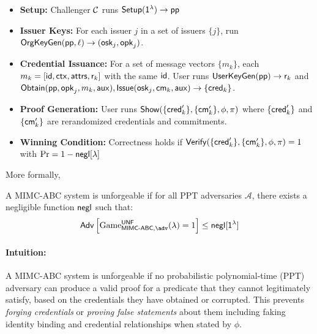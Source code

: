     \begin{itemize}
        \item \textbf{Setup:} Challenger $\mathcal{C}$ runs $\mathsf{Setup}(\mathsf{1^{\lambda}}) \to \mathsf{pp}$
        \item \textbf{Issuer Keys:} For each issuer $j$ in a set of issuers $\{j\}$, run $\mathsf{OrgKeyGen}(\mathsf{pp}, \ell) \to (\mathsf{osk}_j, \mathsf{opk}_j)$.
        \item \textbf{Credential Issuance: } For a set of message vectors $\{m_k\}$, each $m_k = [\mathsf{id}, \mathsf{ctx}, \mathsf{attrs}, \mathsf{r}_k]$ with the same $\mathsf{id}$. User runs $\mathsf{UserKeyGen}(\mathsf{pp}) \to \mathsf{r}_k$ and $\mathsf{Obtain}(\mathsf{pp}, \mathsf{opk}_j, m_k, \mathsf{aux}),\mathsf{Issue}(\mathsf{osk}_j, \mathsf{cm}_k, \mathsf{aux}) \to \{\mathsf{cred}_k\}$. 
        \item \textbf{Proof Generation:} User runs $\mathsf{Show}(\{\mathsf{cred}_k'\}, \{\mathsf{cm}_k'\}, \phi, \pi)$ where $\{\mathsf{cred}_k'\}$ and $\{\mathsf{cm}_k'\}$ are rerandomized credentials and commitments.
        \item \textbf{Winning Condition:} Correctness holds if $\mathsf{Verify}(\{\mathsf{cred}_k'\}, \{\mathsf{cm}_k'\}, \phi, \pi) = 1 $ with $\Pr = 1-\mathsf{negl}[\lambda]$
    \end{itemize}
More formally,















\begin{definition}[Unforgeability]
A MIMC-ABC system is unforgeable if for all PPT adversaries $\mathcal{A}$, there exists a negligible function $\mathsf{negl}$ such that:
\[
\mathsf{Adv}\left[\mathrm{Game}^{\mathsf{\UNF}}_{\MIMCABC, \adv}(\lambda) = 1\right] \leq \negl[\secparam]
\]
\end{definition}

\paragraph{Intuition:} A MIMC-ABC system is unforgeable if no probabilistic polynomial-time (PPT) adversary can produce a valid proof for a predicate that they cannot legitimately satisfy, based on the credentials they have obtained or corrupted. This prevents \emph{forging credentials} or \emph{proving false statements} about them including faking identity binding and credential relationships when stated by $\phi$.

